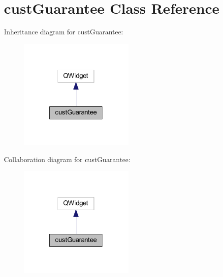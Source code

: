 \hypertarget{classcust_guarantee}{}\section{cust\+Guarantee Class Reference}
\label{classcust_guarantee}


Inheritance diagram for cust\+Guarantee\+:\nopagebreak
\begin{figure}[H]
\begin{center}
\leavevmode
\includegraphics[width=160pt]{classcust_guarantee__inherit__graph}
\end{center}
\end{figure}


Collaboration diagram for cust\+Guarantee\+:\nopagebreak
\begin{figure}[H]
\begin{center}
\leavevmode
\includegraphics[width=160pt]{classcust_guarantee__coll__graph}
\end{center}
\end{figure}
